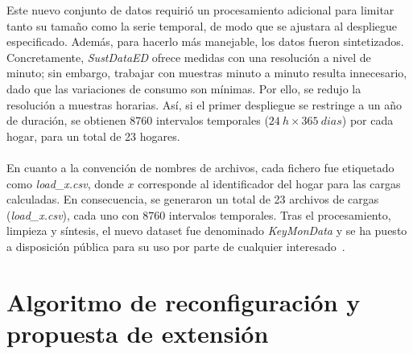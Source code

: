 Este nuevo conjunto de datos requirió un procesamiento adicional para limitar tanto su tamaño como la serie temporal, de modo que se ajustara al despliegue especificado. Además, para hacerlo más manejable, los datos fueron sintetizados. Concretamente, \textit{SustDataED} ofrece medidas con una resolución a nivel de minuto; sin embargo, trabajar con muestras minuto a minuto resulta innecesario, dado que las variaciones de consumo son mínimas. Por ello, se redujo la resolución a muestras horarias. Así, si el primer despliegue se restringe a un año de duración, se obtienen 8760 intervalos temporales ($24\: h \times 365\: dias$) por cada hogar, para un total de 23 hogares.\\
\\
En cuanto a la convención de nombres de archivos, cada fichero fue etiquetado como \textit{load\_x.csv}, donde $x$ corresponde al identificador del hogar para las cargas calculadas. En consecuencia, se generaron un total de 23 archivos de cargas (\textit{load\_x.csv}), cada uno con 8760 intervalos temporales. Tras el procesamiento, limpieza y síntesis, el nuevo dataset fue denominado \textit{KeyMonData} y se ha puesto a disposición pública para su uso por parte de cualquier interesado~\cite{paulaTFM}.



\section{Algoritmo de reconfiguración y propuesta de extensión}  

